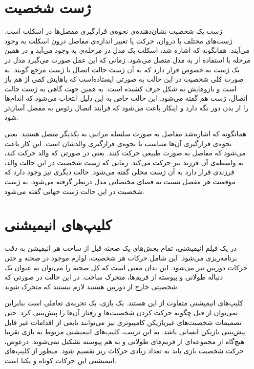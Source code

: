 \section{ژست شخصیت}

ژست یک شخصیت نشان‌دهنده‌ی نحوه‌ی قرارگیری مفصل‌ها در اسکلت است. ژست‌های مختلف با دروان، حرکت یا تغییر اندازه‌ی مفاصل درون اسکلت به وجود می‌‌آیند.
همانگونه که اشاره شد، اسکلت یک مدل در مرحله‌ی 
به وجود می‌‌آید و در همین مرحله با استفاده از 
 به مدل متصل می‌شود. زمانی که این عمل صورت می‌گیرد مدل در یک ژست به خصوص قرار دارد که به آن ژست حالت اتصال
یا
ژست مرجع
گویند.
به صورت کلی شخصیت در این حالت به صورتی ایستاده‌است که پاهایش کمی از هم باز است و 
بازو‌هایش به شکل حرف
کشیده است. به همین جهت گاهی به ژست حالت اتصال،
ژست
هم گفته می‌شود.
این حالت خاص به این دلیل انتخاب می‌شود که اندام‌ها را از بدن دور نگه دارد و اینکار باعث می‌شود که 
فرایند اتصال رئوس به مفصل آسان‌تر شود.

همانگونه که اشاره‌‌شد مفاصل به صورت سلسله مراتبی به یکدیگر متصل هستند. یعنی نحوه‌ی 
قرارگیری آن‌ها متناسب با نحوه‌ی قرارگیری والدشان است.
این کار باعث می‌شود که مفاصل به صورت طبیعی حرکت کنند. یعنی در صورتی که والد حرکت کند، به واسطه‌ی 
آن فرزند نیز حرکت می‌کند.
زمانی که ژست شخصیت در این حالت والد، فرزندی قرار دارد به آن ژست محلی
گفته می‌شود. حالت دیگری نیز وجود دارد که موقعیت هر مفصل نسبت به فضای مختصاتی مدل 
درنظر گرفته می‌شود. به ژست شخصیت در این حالت ژست جهانی
گفته می‌شود.

\section{‌کلیپ‌های انیمیشنی}

در یک فیلم انیمیشنی، تمام بخش‌های یک صحنه قبل از ساخت هر انیمیشن به دقت برنامه‌ریزی می‌شود.
این شامل حرکات هر شخصیت، لوازم موجود در صحنه و حتی حرکات دوربین نیز می‌شود.
این بدان معنی است که کل صحنه را می‌توان به عنوان یک دنباله طولانی و پیوسته از فریم‌ها، متحرک ساخت.
در این حالت در صورتی که شخصیتی خارج از دوربین هستند لازم نیستند که متحرک شوند.

کلیپ‌های انیمیشنی متفاوت از این هستند. یک بازی، یک تجربه‌ی تعاملی است بنابراین نمی‌توان از قبل چگونه حرکت کردن شخصیت‌ها و رفتار آن‌ها را پیش‌بینی کرد.
حتی تصمیمات شخصیت‌های غیربازیکن کامپیوتری نیز می‌توانند تابعی از اقدامات غیر قابل پیش‌بینی بازیکن انسانی باشد.
به این ترتیب، کلیپ‌های انیمیشنی مربوط به بازی تقریبا هیچ‌گاه از مجموعه‌ای از فریم‌های طولانی و به هم پیوسته تشکیل نمی‌شوند.
درعوض، حرکت شخصیت بازی باید به تعداد زیادی حرکات ریز تقسیم شود. 
منظور از کلیپ‌های انیمیشنی این حرکات کوتاه و یکتا است.

